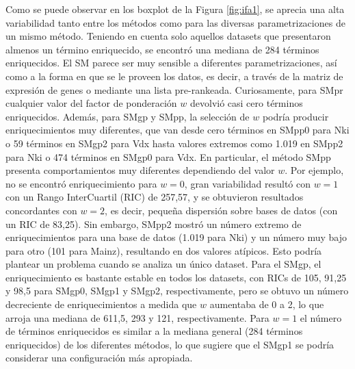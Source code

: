 \documentclass[12pt,twoside]{reedthesis}
\begin{document}
\par

Como se puede observar en los boxplot de la Figura \ref{fig:ifa1}, se aprecia una alta variabilidad tanto entre los métodos como para las diversas parametrizaciones de un mismo método. Teniendo en cuenta solo aquellos datasets que presentaron almenos un término enriquecido, se encontró una mediana de 284 términos enriquecidos. El SM parece ser muy sensible a diferentes parametrizaciones, así como a la forma en que se le proveen los datos, es decir, a través de la matriz de expresión de genes o mediante una lista pre-rankeada. Curiosamente, para SMpr cualquier valor del factor de ponderación \(w\) devolvió casi cero términos enriquecidos. Además, para SMgp y SMpp, la selección de \(w\) podría producir enriquecimientos muy diferentes, que van desde cero términos en SMpp0 para Nki o 59 términos en SMgp2 para Vdx hasta valores extremos como 1.019 en SMpp2 para Nki o 474 términos en SMgp0 para Vdx. En particular, el método SMpp presenta comportamientos muy diferentes dependiendo del valor \(w\). Por ejemplo, no se encontró enriquecimiento para \(w=0\), gran variabilidad resultó con \(w=1\) con un Rango InterCuartil (RIC) de 257,57, y se obtuvieron resultados concordantes con \(w=2\), es decir, pequeña dispersión sobre bases de datos (con un RIC de 83,25). Sin embargo, SMpp2 mostró un número extremo de enriquecimientos para una base de datos (1.019 para Nki) y un número muy bajo para otro (101 para Mainz), resultando en dos valores atípicos. Esto podría plantear un problema cuando se analiza un único dataset. Para el SMgp, el enriquecimiento es bastante estable en todos los datasets, con RICs de 105, 91,25 y 98,5 para SMgp0, SMgp1 y SMgp2, respectivamente, pero se obtuvo un número decreciente de enriquecimientos a medida que \(w\) aumentaba de 0 a 2, lo que arroja una mediana de 611,5, 293 y 121, respectivamente. Para \(w=1\) el número de términos enriquecidos es similar a la mediana general (284 términos enriquecidos) de los diferentes métodos, lo que sugiere que el SMgp1 se podría considerar una configuración más apropiada.
\end{document}
